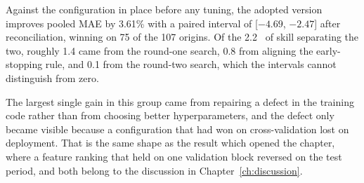 Against the configuration in place before any tuning, the adopted version improves pooled
MAE by 3.61\% with a paired interval of [$-4.69$, $-2.47$] after reconciliation, winning on
75 of the 107 origins. Of the 2.2~\pp{} of skill separating the two, roughly 1.4 came from
the round-one search, 0.8 from aligning the early-stopping rule, and 0.1 from the round-two
search, which the intervals cannot distinguish from zero.

The largest single gain in this group came from repairing a defect in the training code
rather than from choosing better hyperparameters, and the defect only became visible because
a configuration that had won on cross-validation lost on deployment. That is the same shape
as the result which opened the chapter, where a feature ranking that held on one validation
block reversed on the test period, and both belong to the discussion in
Chapter~\ref{ch:discussion}.
